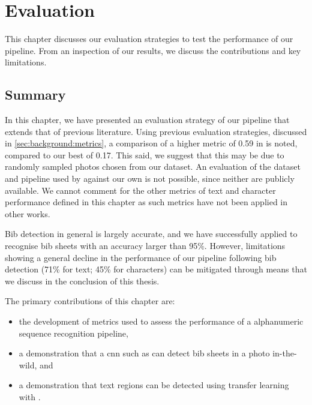 \chapter{Evaluation}
\label{ch:evaluation}

This chapter discusses our evaluation strategies to test the performance of our pipeline. From an inspection of our results, we discuss the contributions and key limitations.



\clearpage

\clearpage

\section{Summary}

In this chapter, we have presented an evaluation strategy of our pipeline that extends that of previous literature. Using previous evaluation strategies, discussed in \cref{sec:background:metrics}, a comparison of a higher \fscore{} metric of 0.59 in \citet{Benami:2012jf} is noted, compared to our best of 0.17. This said, we suggest that this may be due to randomly sampled photos chosen from our dataset. An evaluation of the dataset and pipeline used by \citeauthor{Benami:2012jf} against our own is not possible, since neither are publicly available. We cannot comment for the other metrics of text and character performance defined in this chapter as such metrics have not been applied in other works. 

Bib detection in general is largely accurate, and we have successfully applied \frcnn{} to recognise bib sheets with an accuracy larger than 95\%. However, limitations showing a general decline in the performance of our pipeline following bib detection (71\% for text; 45\% for characters) can be mitigated through means that we discuss in the conclusion of this thesis.

\bigskip

\noindent
The primary contributions of this chapter are:

\begin{itemize}
  \item the development of metrics used to assess the performance of a alphanumeric sequence recognition pipeline,
  \item a demonstration that a \gls{cnn} such as \frcnn{} can detect bib sheets in a photo in-the-wild, and
  \item a demonstration that text regions can be detected using transfer learning with \frcnn{}.
\end{itemize}

